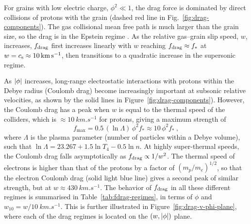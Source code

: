 For grains with low electric charge, \(\phi^2 \ll 1\), the drag force is
dominated by direct collisions of protons with the grain (dashed red
line in Fig.~\ref{fig:drag-components}).  The gas collisional mean
free path is much larger than the grain size, so the drag is in the
Epstein regime \citep{Weidenschilling:1977b}.
As the relative gas--grain slip speed, \(w\), increases, \(f_{\text{drag}}\)
first increases linearly with \(w\) reaching \(f_{\text{drag}} \approx f_*\) at
\(w = c_{\text{s}} \approx \SI{10}{km.s^{-1}}\), then transitions to a quadratic
increase in the supersonic regime.

As \(\lvert\phi\rvert\) increases, long-range electrostatic interactions with
protons within the Debye radius (Coulomb drag) become increasingly
important at subsonic relative velocities, as shown by the solid lines
in Figure~\ref{fig:drag-components}).
However, the Coulomb drag has a peak when \(w\) is equal to the
thermal speed of the colliders, which is
\(\approx \SI{10}{km.s^{-1}}\) for protons, giving a maximum strength of
\begin{equation}
  \label{eq:fdrag-maximum}
  f_{\mathrm{max}} = 0.5\, (\ln\Lambda)\, \phi^2 f_* \approx 10\, \phi^2 f_* \ , 
\end{equation}
where \(\Lambda\) is the plasma parameter (number of particles within a
Debye volume), such that
\(\ln\Lambda = 23.267 + 1.5 \ln T_4 - 0.5 \ln n\).  At highly super-thermal
speeds, the Coulomb drag falls asymptotically as
\(f_{\text{drag}} \propto 1 / w^{2}\).  The thermal speed of electrons is higher than
that of the protons by a factor of \((m_p / m_e)^{1/2}\), so that the
electron Coulomb drag (solid light blue line) gives a second peak of
similar strength, but at \(w \approx \SI{430}{km.s^{-1}}\).  The behavior of
\(f_{\text{drag}}\) in all these different regimes is summarised in
Table~\ref{tab:fdrag-regimes}, in terms of \(\phi\) and
\(w_{10} = w / \SI{10}{km.s^{-1}}\).  This is further illustrated in
Figure~\ref{fig:drag-v-phi-plane}, where each of the drag regimes is
located on the \((w, \lvert\phi\rvert)\) plane.


